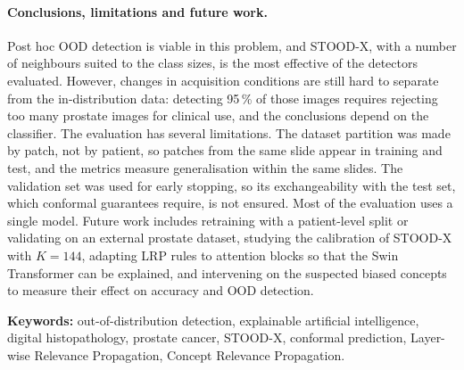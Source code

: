 \paragraph{Conclusions, limitations and future work.} Post hoc OOD detection is viable in this problem, and STOOD-X, with a number of neighbours suited to the class sizes, is the most effective of the detectors evaluated. However, changes in acquisition conditions are still hard to separate from the in-distribution data: detecting 95\,\% of those images requires rejecting too many prostate images for clinical use, and the conclusions depend on the classifier. The evaluation has several limitations. The dataset partition was made by patch, not by patient, so patches from the same slide appear in training and test, and the metrics measure generalisation within the same slides. The validation set was used for early stopping, so its exchangeability with the test set, which conformal guarantees require, is not ensured. Most of the evaluation uses a single model. Future work includes retraining with a patient-level split or validating on an external prostate dataset, studying the calibration of STOOD-X with $K = 144$, adapting LRP rules to attention blocks so that the Swin Transformer can be explained, and intervening on the suspected biased concepts to measure their effect on accuracy and OOD detection.

\medskip
\noindent\textbf{Keywords:} out-of-distribution detection, explainable artificial intelligence, digital histopathology, prostate cancer, STOOD-X, conformal prediction, Layer-wise Relevance Propagation, Concept Relevance Propagation.

\endinput

